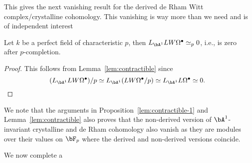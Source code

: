 \documentclass[a4paper,10pt]{amsart}
\begin{document}
\sssec{} This gives the next vanishing result for the derived de Rham Witt complex/crystalline cohomology. This vanishing is way more than we need and is of independent interest


\begin{prop} \label{lem:contractible-1} Let $k$ be a perfect field of characteristic $p$, then $L_{\bA^1}LW\Omega^{\bullet} \simeq_p 0$, i.e., is zero after $p$-completion.
\end{prop}

\begin{proof} This follows from Lemma~\ref{lem:contractible} since 
\[
(L_{\bA^1}LW\Omega^{\bullet})/p \simeq L_{\bA^1}(LW\Omega^{\bullet}/p) \simeq L_{\bA^1}L\Omega^{\bullet} \simeq 0.
\]
\end{proof}

\sssec{} We note that the arguments in Proposition~\ref{lem:contractible-1} and Lemma~\ref{lem:contractible} also proves that the non-derived version of $\bA^1$-invariant crystalline and de Rham cohomology also vanish as they are modules over their values on $\bF_p$ where the derived and non-derived versions coincide.

\sssec{} We now complete a
\end{document}
